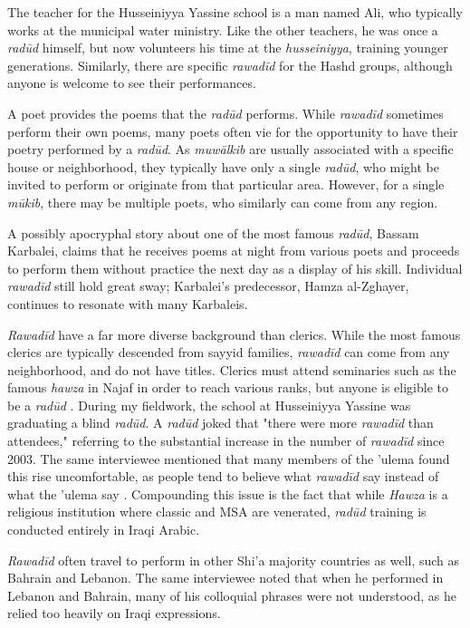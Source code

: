 The teacher for the Husseiniyya Yassine school is a man named Ali, who typically works at the municipal water ministry. Like the other teachers, he was once a \emph{radūd} himself, but now volunteers his time at the \emph{husseiniyya}, training younger generations. Similarly, there are specific \emph{rawadīd} for the Hashd groups, although anyone is welcome to see their performances. 

A poet provides the poems that the \emph{radūd} performs. While \emph{rawadīd} sometimes perform their own poems, many poets often vie for the opportunity to have their poetry performed by a \emph{radūd}. As \emph{muwālkib} are usually associated with a specific house or neighborhood, they typically have only a single \emph{radūd}, who might be invited to perform or originate from that particular area. However, for a single \emph{mūkib}, there may be multiple poets, who similarly can come from any region. 

A possibly apocryphal story about one of the most famous \emph{radūd}, Bassam Karbalei, claims that he receives poems at night from various poets and proceeds to perform them without practice the next day as a display of his skill\cite{al-husseini_interview_2022}. Individual \emph{rawadīd} still hold great sway; Karbalei's predecessor, Hamza al-Zghayer, continues to resonate with many Karbaleis. 

\emph{Rawadīd} have a far more diverse background than clerics. While the most famous clerics are typically descended from sayyid families, \emph{rawadīd} can come from any neighborhood, and do not have titles. Clerics must attend seminaries such as the famous \emph{hawza} in Najaf in order to reach various ranks, but anyone is eligible to be a \emph{radūd} \cite{al-husseini_interview_2022}. During my fieldwork, the school at Husseiniyya Yassine was graduating a blind \emph{radūd}. A \emph{radūd} joked that "there were more \emph{rawadīd} than attendees," referring to the substantial increase in the number of \emph{rawadīd} since 2003. The same interviewee mentioned that many members of the 'ulema found this rise uncomfortable, as people tend to believe what \emph{rawadīd} say instead of what the 'ulema say \cite{al-husseini_interview_2022}. Compounding this issue is the fact that while \emph{Hawza} is a religious institution where classic and MSA are venerated, \emph{radūd} training is conducted entirely in Iraqi Arabic. 

\emph{Rawadīd} often travel to perform in other Shi'a majority countries as well, such as Bahrain and Lebanon. The same interviewee noted that when he performed in Lebanon and Bahrain, many of his colloquial phrases were not understood, as he relied too heavily on Iraqi expressions.

